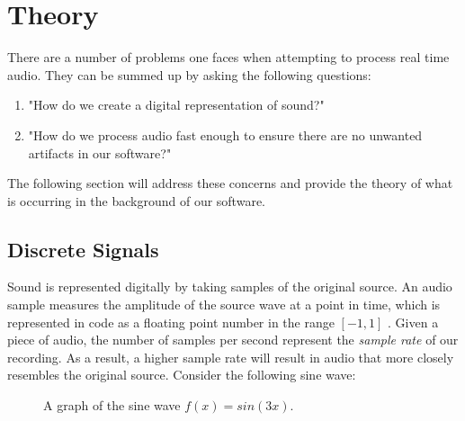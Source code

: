 \documentclass[12pt]{article}
\begin{document}
\newpage
\section{Theory}

There are a number of problems one faces when attempting to process real time audio. They can be summed up by asking the following questions:

\begin{enumerate}
	\item "How do we create a digital representation of sound?"
	\item "How do we process audio fast enough to ensure there are no unwanted artifacts in our software?"
\end{enumerate}

The following section will address these concerns and provide the theory of what is occurring in the background of our software.

\subsection{Discrete Signals}
Sound is represented digitally by taking samples of the original source. An audio sample measures the amplitude of the source wave at a point in time, which is represented in code as a floating point number in the range \([-1, 1]\) \cite{Doumler}. Given a piece of audio, the number of samples per second represent the \textit{sample rate} of our recording. As a result, a higher sample rate will result in audio that more closely resembles the original source. Consider the following sine wave:

\begin{figure}[h] %
\begin{center}
	\caption{A graph of the sine wave \(f(x) = sin(3x)\).}
\end{center}
\end{figure}
\end{document}
